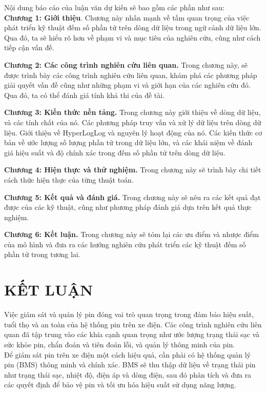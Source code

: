 \documentclass[letterpaper,13pt]{article}
\theoremstyle{mytheor}
\begin{document}
Nội dung báo cáo của luận văn dự kiến sẽ bao gồm các phần như sau:\\

\textbf{Chương 1: Giới thiệu}. Chương này nhấn mạnh về tầm quan trọng của việc phát triển kỹ thuật đếm số phần tử trên dòng dữ liệu trong ngữ cảnh 
dữ liệu lớn. Qua đó, ta sẽ hiểu rõ hơn về phạm vi và mục tiêu của nghiên cứu, cũng như cách tiếp cận vấn đề.

\textbf{Chương 2: Các công trình nghiên cứu liên quan.} Trong chương này, sẽ được trình bày các công trình nghiên cứu liên quan, khám phá các 
phương pháp giải quyết vấn đề cũng như những phạm vi và giới hạn của các nghiên cứu đó. Qua đó, ta có thể đánh giá tính khả thi của đề tài.

\textbf{Chương 3: Kiến thức nền tảng.} Trong chương này giới thiệu về dòng dữ liệu, và các tính chất của nó.
Các phương pháp truy vấn và xử lý dữ liệu trên dòng dữ liệu. Giới thiệu về HyperLogLog và nguyên lý hoạt động của nó. Các kiến thức cơ bản về ước lượng số lượng phần tử trong dữ liệu lớn,
và các khái niệm về đánh giá hiệu suất và độ chính xác trong đếm số phần tử trên dòng dữ liệu.

\textbf{Chương 4: Hiện thực và thử nghiệm. } Trong chương này sẽ trình bày chi tiết cách thức hiện thực của từng thuật toán.

\textbf{Chương 5: Kết quả và đánh giá.} Trong chương này sẽ nêu ra các kết quả đạt được của các kỹ thuật, cũng như phương pháp đánh giá 
dựa trên kết quả thực nghiệm.

\textbf{Chương 6: Kết luận.} Trong chương này sẽ tóm lại các ưu điểm và nhược điểm của mô hình và đưa ra các hướng nghiên cứu phát triển 
các kỹ thuật đếm số phần tử trong tương lai.

\section{KẾT LUẬN}
Việc giám sát và quản lý pin đóng vai trò quan trọng trong đảm bảo hiệu suất, tuổi thọ và an toàn của hệ thống pin trên xe điện. 
Các công trình nghiên cứu liên quan đã tập trung vào các khía cạnh quan trọng như ước lượng trạng thái sạc và sức khỏe pin, 
chẩn đoán và tiên đoán lỗi, và quản lý thông minh của pin.\\

Để giám sát pin trên xe điện một cách hiệu quả, cần phải có hệ thống quản lý pin (BMS) thông minh và chính xác. BMS sẽ thu thập dữ liệu 
về trạng thái pin như trạng thái sạc, nhiệt độ, điện áp và dòng điện, sau đó phân tích và đưa ra các quyết định để bảo vệ pin và tối ưu hóa 
hiệu suất sử dụng năng lượng.\\
\end{document}
